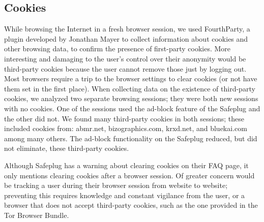 \documentclass[letterpaper,twocolumn,10pt]{article}
\begin{document}

\subsection{Cookies}  
While browsing the Internet in a fresh browser session, we used FourthParty, a plugin developed by Jonathan Mayer to collect information about cookies and other browsing data, to confirm the presence of first-party cookies.  More interesting and damaging to the user's control over their anonymity would be third-party cookies because the user cannot remove those just by logging out.  Most browsers require a trip to the browser settings to clear cookies (or not have them set in the first place).  When collecting data on the existence of third-party cookies, we analyzed two separate browsing sessions; they were both new sessions with no cookies.  One of the sessions used the ad-block feature of the Safeplug and the other did not.  We found many third-party cookies in both sessions; these included cookies from: abmr.net, bizographics.com, krxd.net, and bluekai.com among many others.  The ad-block functionality on the Safeplug reduced, but did not eliminate, these third-party cookies.

Although Safeplug has a warning about clearing cookies on their FAQ page, it only mentions clearing cookies after a browser session.  Of greater concern would be tracking a user during their browser session from website to website; preventing this requires knowledge and constant vigilance from the user, or a browser that does not accept third-party cookies, such as the one provided in the Tor Browser Bundle.
\end{document}
